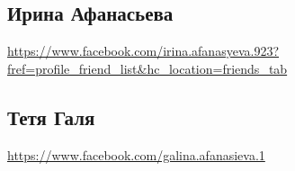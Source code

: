 
\subsection{Ирина Афанасьева}
\url{https://www.facebook.com/irina.afanasyeva.923?fref=profile_friend_list&hc_location=friends_tab}

\subsection{Тетя Галя}
\url{https://www.facebook.com/galina.afanasieva.1}
  
